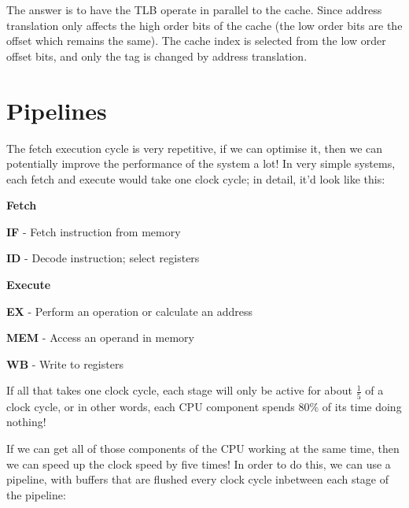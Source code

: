 The answer is to have the TLB operate in parallel to the cache. Since address
translation only affects the high order bits of the cache (the low order bits
are the offset which remains the same). The cache index is selected from the low
order offset bits, and only the tag is changed by address translation.


\section{Pipelines}

The fetch execution cycle is very repetitive, if we can optimise it, then we can
potentially improve the performance of the system a lot! In very simple systems,
each fetch and execute would take one clock cycle; in detail, it'd look like
this:

\begin{description}
  \item \textbf{Fetch}
    \begin{description}
      \item \textbf{IF} - Fetch instruction from memory
      \item \textbf{ID} - Decode instruction; select registers
    \end{description}
  \item \textbf{Execute}
    \begin{description}
      \item \textbf{EX} - Perform an operation or calculate an address
      \item \textbf{MEM} - Access an operand in memory
      \item \textbf{WB} - Write to registers
    \end{description}
\end{description}

If all that takes one clock cycle, each stage will only be active for about
$\frac{1}{5}$ of a clock cycle, or in other words, each CPU component spends
$80\%$ of its time doing nothing!

If we can get all of those components of the CPU working at the same time, then
we can speed up the clock speed by five times! In order to do this, we can use a
pipeline, with buffers that are flushed every clock cycle inbetween each stage
of the pipeline:


